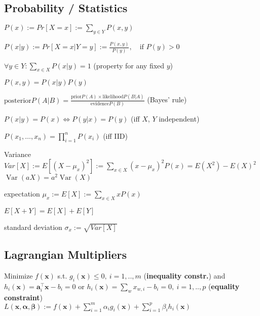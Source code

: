 \subsection*{Probability / Statistics}
\begin{inparaitem}
	\item $P(x) := Pr[X = x] := \sum_{y \in Y} P(x, y)$
	\item $P(x|y) := Pr[X = x | Y = y] := \frac{P(x,y)}{P(y)},\quad \text{if } P(y) > 0$
	\item $\forall y \in Y: \sum_{x \in X} P(x|y) = 1$ (property for any fixed $y$)
	\item $P(x, y) = P(x|y) P(y)$
	\item $\text{posterior} P(A|B)=\frac{\text{prior} P(A)\times\text{likelihood} P(B|A)}{\text{evidence} P(B)}$ (Bayes' rule)
	\item $P(x|y) = P(x) \Leftrightarrow P(y|x) = P(y)$ (iff $X$, $Y$ independent)
	\item $P(x_1, \ldots, x_n) = \prod_{i=1}^n P(x_i)$ (iff IID)
	\item Variance $Var[X]:= E[(X-\mu_x)^2]:=\sum_{x \in X}(x-\mu_x)^2P(x)= E(X^2) - E(X)^2$ $\operatorname{Var}(aX)=a^2\operatorname{Var}(X)$
	\item expectation $\mu_x := E[X]:=\sum_{x \in X}xP(x)$
	\item $E[X+Y] = E[X] + E[Y]$
	\item standard deviation $\sigma_x := \sqrt{Var[X]}$
\end{inparaitem}


\subsection*{Lagrangian Multipliers}
Minimize  $f(\mathbf{x})$ s.t. $g_i(\mathbf{x}) \leq 0,\ i = 1, .., m$ (\textbf{inequality constr.}) and $h_i(\mathbf{x}) = \mathbf{a}_i^\top \mathbf{x} - b_i = 0$ or $h_i(\mathbf{x}) = \sum_{w} x_{w,i} - b_i = 0,\ i = 1, .., p$ (\textbf{equality constraint}) \\
$L(\mathbf{x}, \boldsymbol{\alpha}, \boldsymbol{\beta}) := f(\mathbf{x}) + \sum_{i=1}^m \alpha_i g_i(\mathbf{x}) + \sum_{i=1}^p \beta_i h_i(\mathbf{x})$
